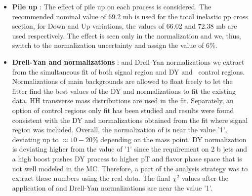 \begin{itemize}







 \item {\bf Pile up }: The effect of pile up on each
   process is considered. The recommended nominal value of 69.2 mb is used for the total inelastic pp cross section, for Down and Up variations, the values of 66.02 and 72.38 mb are used respectively. The effect is seen only in the normalization and we, thus, switch to the normalization uncertainty and assign the value of $6\%$.


 \item {\bf Drell-Yan and \ttbar normalizations }: \ttbar and Drell-Yan
   normalizations we extract from the simultaneous fit of both signal
   region and DY and \ttbar ~control regions. Normalizations of main backgrounds are allowed to float freely to let the fitter find the best values of the DY and \ttbar normalizations to fit the existing data. HH transverse mass distributions are used in the fit. Separately, an option of control regions only fit has been studied and results were found consistent with the DY and \ttbar normalizations obtained from the fit where signal region was included. Overall, the normalization of \ttbar is near the value
   '1', deviating up to $\approx10-20\%$ depending on the mass point. DY normalization is deviating higher from the value of '1' since the requirement on 2 b jets and a high boost pushes DY process to higher pT and flavor phase space that is not well modeled in the MC. Therefore, a part of the analysis strategy was to extract these numbers using the real data. The final $\chi^2$ values after the application of \ttbar and Drell-Yan normalizations are near the value '1'.


\end{itemize}
